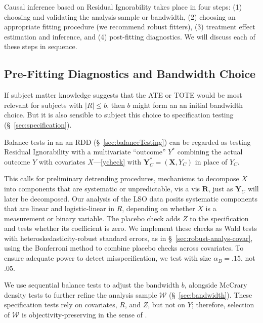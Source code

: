 Causal inference based on Residual Ignorability takes place
in four steps: (1) choosing and validating the analysis sample or
bandwidth, (2) choosing an appropriate fitting procedure (we recommend
robust fitters), (3) treatment effect estimation and inference, and
(4) post-fitting diagnostics.
We will discuss each of these steps in sequence.

\subsection{Pre-Fitting Diagnostics and Bandwidth Choice}
\label{sec:bandwidthChoice}

If subject matter knowledge suggests that the ATE or TOTE would be
most relevant for subjects with $|R|\le b$, then $b$ might form an an
initial bandwidth choice. But it
is also sensible to subject this choice to specification
testing (\S~\ref{sec:specification}).

Balance tests in an an RDD (\S~\ref{sec:balanceTesting})
can be regarded as testing Residual Ignorability with a multivariate
``outcome'' $Y^{*}$ combining the actual outcome $Y$ with covariates $X$---\eqref{ycheck} with
$\mathbf{Y}_{C}^{*} = (\mathbf{X}, {Y}_C)$ in place of $Y_{C}$.

This calls for preliminary detrending procedures, mechanisms to
decompose  $X$ into components that are systematic or unpredictable,
vis a vis $\mathbf{R}$, just as ${\mathbf{Y}_C}$ will later be decomposed.
Our analysis of the LSO data posits systematic components that are
linear and logistic-linear in $R$, depending on whether $X$ is
a measurement or binary variable. %
The placebo check adds $Z$ to the specification and tests whether its
coefficient is zero.  We implement these checks as Wald tests with
heteroskedasticity-robust standard errors, as in
\S~\ref{sec:robust-analys-covar}, using the Bonferroni method to
combine placebo checks across covariates.
To ensure adequate power to detect misspecification,
we test with size $\alpha_{B}=.15$, not $.05$.

We use sequential balance tests to adjust the bandwidth $b$, alongside
McCrary density tests to further
refine the analysis sample $\mathcal{W}$ (\S~\ref{sec:bandwidth}).
These specification tests rely on covariates, $R$, and $Z$, but not on
$Y$; therefore, selection of $\mathcal{W}$ is objectivity-preserving
in the sense of \citet{rubin2007design}.

